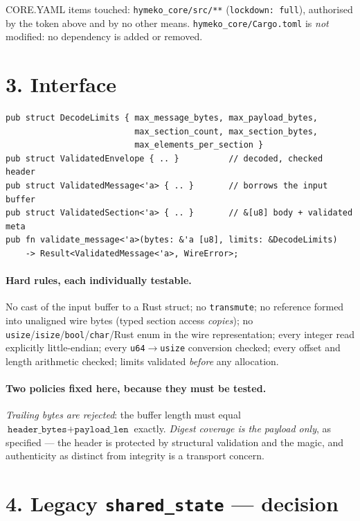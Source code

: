 \documentclass[11pt,a4paper]{article}
\begin{document}
CORE.YAML items touched: \texttt{hymeko\_core/src/**} (\texttt{lockdown: full}),
authorised by the token above and by no other means. \texttt{hymeko\_core/Cargo.toml}
is \emph{not} modified: no dependency is added or removed.

\section*{3. Interface}

\begin{verbatim}
pub struct DecodeLimits { max_message_bytes, max_payload_bytes,
                          max_section_count, max_section_bytes,
                          max_elements_per_section }
pub struct ValidatedEnvelope { .. }          // decoded, checked header
pub struct ValidatedMessage<'a> { .. }       // borrows the input buffer
pub struct ValidatedSection<'a> { .. }       // &[u8] body + validated meta
pub fn validate_message<'a>(bytes: &'a [u8], limits: &DecodeLimits)
    -> Result<ValidatedMessage<'a>, WireError>;
\end{verbatim}

\paragraph{Hard rules, each individually testable.}
No cast of the input buffer to a Rust struct; no \texttt{transmute}; no
reference formed into unaligned wire bytes (typed section access \emph{copies});
no \texttt{usize}/\texttt{isize}/\texttt{bool}/\texttt{char}/Rust enum in the
wire representation; every integer read explicitly little-endian; every
\texttt{u64}$\rightarrow$\texttt{usize} conversion checked; every offset and
length arithmetic checked; limits validated \emph{before} any allocation.

\paragraph{Two policies fixed here, because they must be tested.}
\emph{Trailing bytes are rejected}: the buffer length must equal
$\texttt{header\_bytes}+\texttt{payload\_len}$ exactly.
\emph{Digest coverage is the payload only}, as specified --- the header is
protected by structural validation and the magic, and authenticity as distinct
from integrity is a transport concern.

\section*{4. Legacy \texttt{shared\_state} --- decision}
\end{document}
